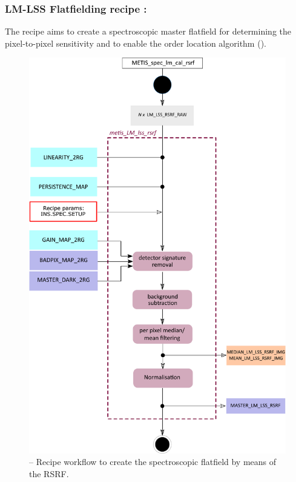 \subsubsection{LM-LSS Flatfielding recipe :}\label{rec:metis_lm_lss_rsrf}
The recipe \hyperref[rec:metis_lm_lss_rsrf]{} aims to create a spectroscopic master flatfield for determining the pixel-to-pixel sensitivity and to enable the order location algorithm (\hyperref[rec:metis_lm_lss_trace]{}).
\begin{figure}[ht]
  \centering
  \includegraphics[width=0.5\textheight]{figures/metis_lm_lss_rsrf_v0.83.pdf}
  \caption[Recipe: ]{ --
    Recipe workflow to create the spectroscopic flatfield by means of the \ac{RSRF}.}
  \label{Fig:rec_lm_lss_rsrf}
\end{figure}


